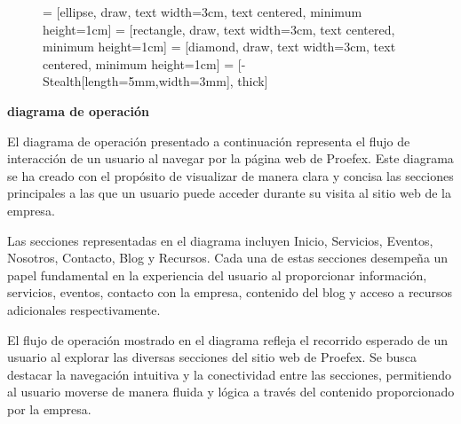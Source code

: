 \begin{figure}[!ht]
\centering
{} = [ellipse, draw, text width=3cm, text centered, minimum height=1cm]
 = [rectangle, draw, text width=3cm, text centered, minimum height=1cm]
 = [diamond, draw, text width=3cm, text centered, minimum height=1cm]
 = [-{Stealth[length=5mm,width=3mm]}, thick]

\end{figure}

\newpage
\textbf{diagrama de operación}

El diagrama de operación presentado a continuación representa el flujo de interacción de un usuario al navegar por la página web de Proefex. Este diagrama se ha creado con el propósito de visualizar de manera clara y concisa las secciones principales a las que un usuario puede acceder durante su visita al sitio web de la empresa.

Las secciones representadas en el diagrama incluyen Inicio, Servicios, Eventos, Nosotros, Contacto, Blog y Recursos. Cada una de estas secciones desempeña un papel fundamental en la experiencia del usuario al proporcionar información, servicios, eventos, contacto con la empresa, contenido del blog y acceso a recursos adicionales respectivamente.

El flujo de operación mostrado en el diagrama refleja el recorrido esperado de un usuario al explorar las diversas secciones del sitio web de Proefex. Se busca destacar la navegación intuitiva y la conectividad entre las secciones, permitiendo al usuario moverse de manera fluida y lógica a través del contenido proporcionado por la empresa.

